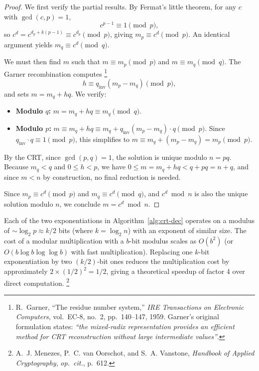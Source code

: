 \begin{proof}
We first verify the partial results. By Fermat's little theorem, for any $c$ with
$\gcd(c,p)=1$,
\[
  c^{p-1} \equiv 1 \pmod{p},
\]
so $c^d = c^{d_p + k(p-1)} \equiv c^{d_p} \pmod{p}$, giving $m_p \equiv c^d \pmod{p}$.
An identical argument yields $m_q \equiv c^d \pmod{q}$.

We must then find $m$ such that $m \equiv m_p \pmod{p}$ and $m \equiv m_q \pmod{q}$.
The Garner recombination computes%
\footnote{R.~Garner, ``The residue number system,'' \textit{IRE Transactions on
Electronic Computers}, vol.~EC-8, no.~2, pp.~140--147, 1959.
Garner's original formulation states: \textit{``the mixed-radix representation
provides an efficient method for CRT reconstruction without large intermediate values''}.}
\[
  h \equiv q_{\text{inv}}(m_p - m_q) \pmod{p},
\]
and sets $m = m_q + hq$. We verify:
\begin{itemize}
  \item \textbf{Modulo $q$:} $m = m_q + hq \equiv m_q \pmod{q}$. 
  \item \textbf{Modulo $p$:} $m \equiv m_q + hq \equiv m_q + q_{\text{inv}}(m_p - m_q) \cdot q \pmod{p}$.
  Since $q_{\text{inv}} \cdot q \equiv 1 \pmod{p}$, this simplifies to
  $m \equiv m_q + (m_p - m_q) = m_p \pmod{p}$. 
\end{itemize}
By the CRT, since $\gcd(p,q)=1$, the solution is unique modulo $n = pq$. Because
$m_q < q$ and $0 \leq h < p$, we have $0 \leq m = m_q + hq < q + pq = n + q$, and
since $m < n$ by construction, no final reduction is needed.

Since $m_p \equiv c^d \pmod{p}$ and $m_q \equiv c^d \pmod{q}$, and $c^d \bmod n$ is
also the unique solution modulo $n$, we conclude $m = c^d \bmod n$.
\end{proof}

\begin{remark}
Each of the two exponentiations in Algorithm~\ref{alg:crt-dec} operates on a modulus of
$\sim \log_2 p \approx k/2$ bits (where $k = \log_2 n$) with an exponent of similar
size. The cost of a modular multiplication with a $b$-bit modulus scales as $O(b^2)$
(or $O(b\log b \log\log b)$ with fast multiplication). Replacing one $k$-bit exponentiation
by two $(k/2)$-bit ones reduces the multiplication cost by approximately
$2 \times (1/2)^2 = 1/2$, giving a theoretical speedup of factor 4 over direct
computation.%
\footnote{A.~J. Menezes, P.~C. van Oorschot, and S.~A. Vanstone,
\textit{Handbook of Applied Cryptography}, \textit{op.\ cit.}, p.~612.}
\end{remark}

